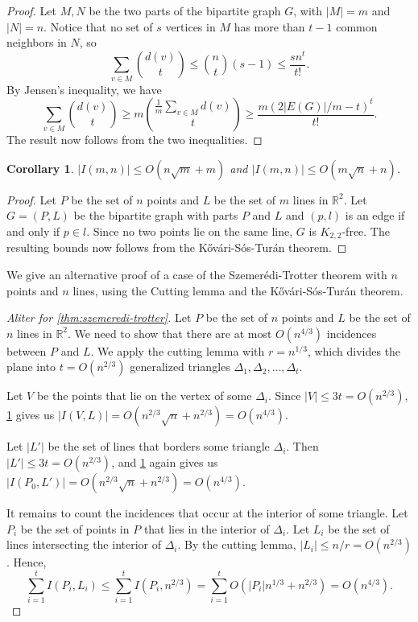 \documentclass[12pt,reqno]{amsart}
\newtheorem{corollary}[theorem]{Corollary}
\theoremstyle{definition}
\theoremstyle{remark}
\renewcommand{\leq}{\leqslant}
\renewcommand{\geq}{\geqslant}
\def\R{\mathbb{R}}
\numberwithin{equation}{section}
\begin{document}
\begin{proof}
	Let $M, N$ be the two parts of the bipartite graph $G$, with $|M| = m$ and $|N| = n$. Notice that no set of $s$ vertices in $M$ has more than $t - 1$ common neighbors in $N$, so
	\[
		\sum_{v \in M} \binom{d(v)}{t} \leq \binom{n}{t} (s - 1) \leq \frac{sn^t}{t!}.
	\]
	By Jensen's inequality, we have
	\[
		\sum_{v \in M} \binom{d(v)}{t} \geq m\binom{\frac{1}{m}\sum_{v \in M} d(v)}{t} \geq \frac{m(2|E(G)|/m - t)^t}{t!}.
	\]
	The result now follows from the two inequalities.
\end{proof}

\begin{corollary}\label{cor:ks}
	$|I(m, n)| \leq O(n\sqrt{m} + m)$ and $|I(m, n)| \leq O(m\sqrt{n} + n)$.
\end{corollary}

\begin{proof}
	Let $P$ be the set of $n$ points and $L$ be the set of $m$ lines in $\R^2$. Let $G = (P, L)$ be the bipartite graph with parts $P$ and $L$ and $(p, l)$ is an edge if and only if $p \in l$. Since no two points lie on the same line, $G$ is $K_{2, 2}$-free. The resulting bounds now follows from the Kővári-Sós-Turán theorem.
\end{proof}

We give an alternative proof of a case of the Szemerédi-Trotter theorem with $n$ points and $n$ lines, using the Cutting lemma and the Kővári-Sós-Turán theorem.

\begin{proof}[Aliter for \cref{thm:szemeredi-trotter}]
	Let $P$ be the set of $n$ points and $L$ be the set of $n$ lines in $\R^2$. We need to show that there are at most $O(n^{4/3})$ incidences between $P$ and $L$. We apply the cutting lemma with $r = n^{1/3}$, which divides the plane into $t = O(n^{2/3})$ generalized triangles $\Delta_1, \Delta_2, \ldots, \Delta_t$. 
	
	Let $V$ be the points that lie on the vertex of some $\Delta_i$. Since $|V| \leq 3t = O(n^{2/3})$, \cref{cor:ks} gives us $|I(V, L)| = O(n^{2/3}\sqrt{n} + n^{2/3}) = O(n^{4/3})$.

	Let $|L'|$ be the set of lines that borders some triangle $\Delta_i$. Then $|L'| \leq 3t = O(n^{2/3})$, and \cref{cor:ks} again gives us $|I(P_0, L')| = O(n^{2/3}\sqrt{n} + n^{2/3}) = O(n^{4/3})$.

	It remains to count the incidences that occur at the interior of some triangle. Let $P_i$ be the set of points in $P$ that lies in the interior of $\Delta_i$. Let $L_i$ be the set of lines intersecting the interior of $\Delta_i$. By the cutting lemma, $|L_i| \leq n/r = O(n^{2/3})$. Hence,
	\[
		\sum_{i = 1}^t I(P_i, L_i) \leq \sum_{i = 1}^t I(P_i, n^{2/3}) = \sum_{i = 1}^t O(|P_i|n^{1/3} + n^{2/3}) = O(n^{4/3}).
	\]
\end{proof}
\end{document}
